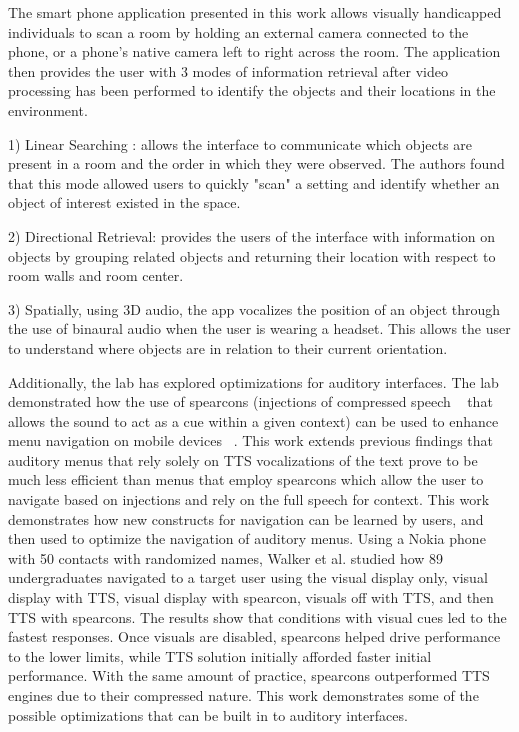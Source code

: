 The smart phone application presented in this work allows visually handicapped
individuals to scan a room by holding an external camera connected to the phone,
or a phone's native camera left to right across the room. The application then
provides the user with 3 modes of information retrieval after video processing
has been performed to identify the objects and their locations in the environment.

1) Linear Searching : allows the interface to communicate which objects are
present in a room and the order in which they were observed.  The authors found
that this mode allowed users to quickly "scan" a setting and identify whether an
object of interest existed in the space.

2) Directional Retrieval: provides the users of the interface with information
on objects by grouping related objects and returning their location with respect
to room walls and room center.

3) Spatially, using 3D audio, the app vocalizes the position of an object through
the use of binaural audio when the user is wearing a headset. This allows the user
to understand where objects are in relation to their current orientation.

Additionally, the lab has explored optimizations for auditory interfaces. The
lab demonstrated how the use of spearcons (injections of compressed speech ~\cite{
jeon2009enhanced} that allows the sound to act as a cue within a given context)
can be used to enhance menu navigation on mobile devices ~\cite{
walker2009spearcon}. This work extends previous findings that auditory menus
that rely solely on TTS vocalizations of the text prove to be much less efficient
than menus that employ spearcons which allow the user to navigate based on injections
and rely on the full speech for context.  This work demonstrates how new constructs
for navigation can be learned by users, and then used to optimize the navigation
of auditory menus.  Using a Nokia phone with 50 contacts with randomized names,
Walker et al. studied how 89 undergraduates navigated to a target user using
the visual display only, visual display with TTS, visual display with spearcon,
visuals off with TTS, and then TTS with spearcons. The results show that conditions
with visual cues led to the fastest responses.  Once visuals are disabled, spearcons
helped drive performance to the lower limits, while TTS solution initially afforded
faster initial performance.  With the same amount of practice, spearcons outperformed
TTS engines due to their compressed nature.  This work demonstrates some of the
possible optimizations that can be built in to auditory interfaces.

